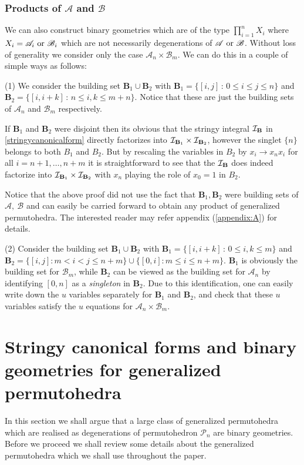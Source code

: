 \documentclass[hidelinks,12pt]{article}
\begin{document}
\subsubsection{Products of ${\mathscr A}$ and $\mathscr{B}$}
We can also construct binary geometries which are of the type $\prod_{i=1}^n X_i$ where $X_i={\mathscr A_i}~{\rm or}~{\mathscr B_i}$ which are not necessarily degenerations of ${\mathscr A}~{\rm or}~{\mathscr B}$. Without loss of generality we consider only the case ${\mathscr A_n}\times {\mathscr B_m}$. We can do this in a couple of simple ways as follows:

(1) We consider the building set $\mathbf{B}_{1}\cup \mathbf{B}_{2}$ with $\mathbf B_1= \{[i,j]\,:\, 0\leq i\leq j\leq n\}$ and $\mathbf B_2= \{[i,i+k]\,:\, n\leq i, k \leq m+n\}$. Notice that these are just the building sets of ${\mathscr A_n}$ and ${\mathscr B_m}$ respectively.

If $\mathbf{B}_{1}$ and $\mathbf{B}_{2}$ were disjoint then its obvious that the stringy integral ${\cal I}_{\mathbf B}$ in \eqref{stringycanonicalform} directly factorizes into ${\cal I}_{\mathbf B_1}\times {\cal I}_{\mathbf B_2}$, however the singlet $\{n\}$ belongs to both $B_1$ and $B_2$. But by rescaling the variables in $B_2$ by $x_i \rightarrow x_n x_i$ for all $i=n+1,\dots,n+m $ it is straightforward to see that the ${\cal I}_{\mathbf B}$ does indeed factorize into ${\cal I}_{\mathbf B_1}\times {\cal I}_{\mathbf B_2}$ with $x_n$ playing the role of $x_0=1$ in $B_2$.

Notice that the above proof did not use the fact that ${\mathbf B_1}, {\mathbf B_2}$ were building sets of ${\mathscr A},~{\mathscr B}$ and can easily be carried forward to obtain any product of generalized permutohedra. The interested reader may refer appendix (\ref{appendix:A}) for details.


(2) Consider the building set  $\mathbf{B}_{1}\cup \mathbf{B}_{2}$ with $\mathbf{B}_{1}=\{[i,i{+}k]\,:\,0\leq i, k\leq m\}$ and $\mathbf{B}_{2}=\{[i,j]: m<i<j\leq n+m \}\cup \{[0,i]:  m\leq i\leq n+m\}$. $\mathbf{B}_{1}$ is obviously the building set for $\mathscr{B}_{m}$, while $\mathbf{B}_{2}$ can be viewed as the building set for $\mathscr{A}_{n}$ by identifying $[0,n]$ as a \emph{singleton} in $\mathbf{B}_{2}$. Due to this identification, one can easily write down the $u$ variables separately for $\mathbf{B}_{1}$ and $\mathbf{B}_{2}$, and check that these $u$ variables satisfy the $u$ equations for $\mathscr{A}_{n}\times \mathscr{B}_{m}$.

\section{Stringy canonical forms and binary geometries for generalized permutohedra}
In this section we shall argue that a large class of generalized permutohedra which are realised as degenerations of permutohedron ${\mathscr P_n}$ are binary geometries. Before we proceed we shall review some details about the generalized permutohedra \cite{Postnikov:2005,Postnikov:2006} which we shall use throughout the paper.
\end{document}
